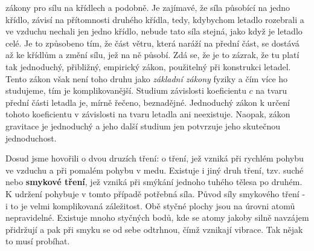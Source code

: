     zákony pro sílu na křídlech a podobně. Je zajímavé, že síla působící na jedno křídlo, závisí na 
    přítomnosti druhého křídla, tedy, kdybychom letadlo rozebrali a ve vzduchu nechali jen jedno 
    křídlo, nebude tato síla stejná, jako když je letadlo celé. Je to způsobeno tím, že část větru, 
    která naráží na přední část, se dostává až ke křídlům a změní sílu, jež na ně působí. Zdá se, 
    že je to zázrak, že tu platí tak jednoduchý, přibližný, empirický zákon, použitelný při 
    konstrukci letadel. Tento zákon však není toho druhu jako \emph{základní zákony} fyziky a čím 
    více ho studujeme, tím je komplikovanější. Studium závislosti koeficientu \(c\) na tvaru přední 
    části letadla je, mírně řečeno, beznadějné. Jednoduchý zákon k určení tohoto koeficientu v 
    závislosti na tvaru letadla ani neexistuje. Naopak, zákon gravitace je jednoduchý a jeho další 
    studium jen potvrzuje jeho skutečnou jednoduchost.
    
    Dosud jsme hovořili o dvou druzích tření: o tření, jež vzniká při rychlém pohybu ve vzduchu a 
    při pomalém pohybu v medu. Existuje i jiný druh tření, tzv. suché nebo \textbf{smykové tření}, 
    jež vzniká při smýkání jednoho tuhého tělesa po druhém. K udržení pohybuje v tomto případě 
    potřebná síla. Původ síly smykového tření - i to je velmi komplikovaná záležitost. Obě styčné 
    plochy jsou na úrovni atomů nepravidelné. Existuje mnoho styčných bodů, kde se atomy jakoby 
    silně navzájem přidržují a pak při smyku se od sebe odtrhnou, čímž vznikají vibrace. Tak nějak 
    to musí probíhat.
    
